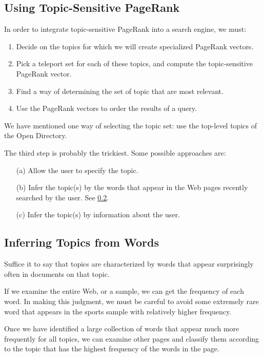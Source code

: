 \subsection{Using Topic-Sensitive PageRank}\label{subsec:using-topic-sensitive-pagerank}

In order to integrate topic-sensitive PageRank into a search engine, we must:
\begin{enumerate}
    \item Decide on the topics for which we will create specialized PageRank vectors.
    \item Pick a teleport set for each of these topics, and compute the topic-sensitive PageRank vector.
    \item Find a way of determining the set of topic that are most relevant.
    \item Use the PageRank vectors to order the results of a query.
\end{enumerate}

\noindent We have mentioned one way of selecting the topic set: use the top-level topics of the Open Directory.

The third step is probably the trickiest. Some possible approaches are:
\begin{itemize}
    \item[(a)] Allow the user to specify the topic.
    \item[(b)] Infer the topic(s) by the words that appear in the Web pages recently searched by the user. See \ref{subsec:inferring-topics-from-words}.
    \item[(c)] Infer the topic(s) by information about the user.
\end{itemize}

\subsection{Inferring Topics from Words}\label{subsec:inferring-topics-from-words}

Suffice it to say that topics are characterized by words that appear surprisingly often in documents on that topic. 

If we examine the entire Web, or a sample, we can get the frequency of each word. In making this judgment, we must be careful to avoid some extremely rare word that appears in the sports sample with relatively higher frequency.  

Once we have identified a large collection of words that appear much more frequently for all topics, we can examine other pages and classify them according to the topic that has the highest frequency of the words in the page.

